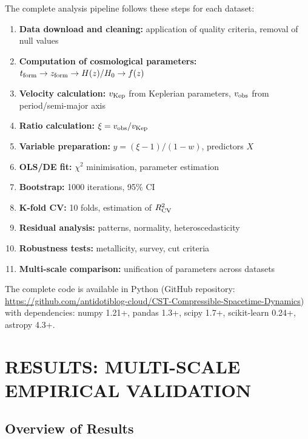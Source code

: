 \documentclass[11pt,a4paper]{article}
\providecommand{\tightlist}{\setlength{\itemsep}{0pt}\setlength{\parskip}{0pt}}
\begin{document}
The complete analysis pipeline follows these steps for each dataset:

\begin{enumerate}
\def\labelenumi{\arabic{enumi}.}
\tightlist
\item
  \textbf{Data download and cleaning:} application of quality criteria,
  removal of null values
\item
  \textbf{Computation of cosmological parameters:}
  \(t_{\rm form} \to z_{\rm form} \to H(z)/H_0 \to f(z)\)
\item
  \textbf{Velocity calculation:} \(v_{\rm Kep}\) from Keplerian
  parameters, \(v_{\rm obs}\) from period/semi-major axis
\item
  \textbf{Ratio calculation:} \(\xi = v_{\rm obs}/v_{\rm Kep}\)
\item
  \textbf{Variable preparation:} \(y = (\xi-1)/(1-w)\), predictors \(X\)
\item
  \textbf{OLS/DE fit:} \(\chi^2\) minimisation, parameter estimation
\item
  \textbf{Bootstrap:} 1000 iterations, 95\% CI
\item
  \textbf{K-fold CV:} 10 folds, estimation of \(R^2_{\rm CV}\)
\item
  \textbf{Residual analysis:} patterns, normality, heteroscedasticity
\item
  \textbf{Robustness tests:} metallicity, survey, cut criteria
\item
  \textbf{Multi-scale comparison:} unification of parameters across
  datasets
\end{enumerate}

The complete code is available in Python (GitHub repository:
\url{https://github.com/antidotiblog-cloud/CST-Compressible-Spacetime-Dynamics})
with dependencies: numpy 1.21+, pandas 1.3+, scipy 1.7+, scikit-learn
0.24+, astropy 4.3+.

\hypertarget{results-multi-scale-empirical-validation}{%
\section{RESULTS: MULTI-SCALE EMPIRICAL
VALIDATION}\label{results-multi-scale-empirical-validation}}

\hypertarget{overview-of-results}{%
\subsection{Overview of Results}\label{overview-of-results}}
\end{document}

